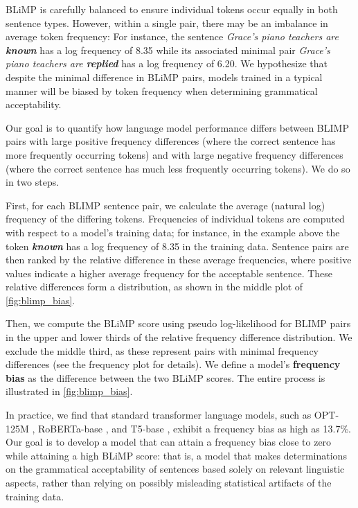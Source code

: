 BLiMP is carefully balanced to ensure individual tokens occur equally in both sentence types. However, within a single pair, there may be an imbalance in average token frequency: For instance, the sentence
\textit{Grace's piano teachers are \textbf{known}} has a log frequency of 8.35 while its associated minimal pair \textit{Grace's piano teachers are \textbf{replied}} has a log frequency of 6.20.  We hypothesize that despite the minimal difference in BLiMP pairs, models trained in a typical manner will be biased by token frequency when determining grammatical acceptability.

Our goal is to quantify how language model performance differs between BLIMP pairs with large positive frequency differences (where the correct sentence has more frequently occurring tokens) and with large negative frequency differences (where the correct sentence has much less frequently occurring tokens). We do so in two steps.

First, for each BLIMP sentence pair, we calculate the average (natural log) frequency of the differing tokens. Frequencies of individual tokens are computed with respect to a model's training data; for instance, in the example above the token \textit{\textbf{known}} has a log frequency of 8.35 in the training data. Sentence pairs are then ranked by the relative difference in these average frequencies, where positive values indicate a higher average frequency for the acceptable sentence. These relative differences form a distribution, as shown in the middle plot of \cref{fig:blimp_bias}. 

Then, we compute the BLiMP score using pseudo log-likelihood \citep{salazar2020masked} for BLIMP pairs in the upper and lower thirds of the relative frequency difference distribution. We exclude the middle third, as these represent pairs with minimal frequency differences (see the frequency plot for details). We define a model's \textbf{frequency bias} as the difference between the two BLiMP scores. The entire process is illustrated in \cref{fig:blimp_bias}. 

In practice, we find that standard transformer language models, such as OPT-125M \citep{zhang2022opt}, RoBERTa-base \citep{liu2019roberta}, and T5-base \citep{raffel2020t5}, exhibit a frequency bias as high as 13.7\%. Our goal is to develop a model that can attain a frequency bias close to zero while attaining a high BLiMP score: that is, a model that makes determinations on the grammatical acceptability of sentences based solely on relevant linguistic aspects, rather than relying on possibly misleading statistical artifacts of the training data. 

